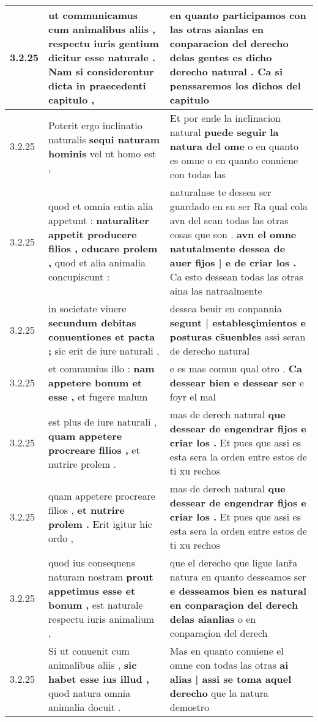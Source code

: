 \begin{tabular}{|p{1cm}|p{6.5cm}|p{6.5cm}|}
3.2.25 & ut communicamus cum animalibus aliis , \textbf{ respectu iuris gentium dicitur esse naturale . } Nam si considerentur dicta in praecedenti capitulo , & en quanto participamos con las otras aianlas \textbf{ en conparacion del derecho delas gentes es dicho derecho natural . } Ca si penssaremos los dichos del capitulo \\\hline
3.2.25 & Poterit ergo inclinatio naturalis \textbf{ sequi naturam hominis } vel ut homo est , & Et por ende la inclinacion natural \textbf{ puede seguir la natura del ome } o en quanto es omne o en quanto conuiene con todas las \\\hline
3.2.25 & quod et omnia entia alia appetunt : \textbf{ naturaliter appetit producere filios , educare prolem , } quod et alia animalia concupiscunt : & naturalnse te dessea ser guardado en su ser Ra qual cola avn del sean todas las otras cosas que son . \textbf{ avn el omne natutalmente dessea de auer fijos | e de criar los . } Ca esto dessean todas las otras aina las natraalmente \\\hline
3.2.25 & in societate viuere \textbf{ secundum debitas conuentiones et pacta ; } sic erit de iure naturali , & dessea beuir en conpannia \textbf{ segunt | establesçimientos e posturas cs̃uenbles } assi seran de derecho natural \\\hline
3.2.25 & et communius illo : \textbf{ nam appetere bonum et esse , } et fugere malum & e es mas comun qual otro . \textbf{ Ca dessear bien e dessear ser } e foyr el mal \\\hline
3.2.25 & est plus de iure naturali , \textbf{ quam appetere procreare filios , } et nutrire prolem . & mas de derech natural \textbf{ que dessear de engendrar fijos e criar los . } Et pues que assi es esta sera la orden entre estos de ti xu rechos \\\hline
3.2.25 & quam appetere procreare filios , \textbf{ et nutrire prolem . } Erit igitur hic ordo , & mas de derech natural \textbf{ que dessear de engendrar fijos e criar los . } Et pues que assi es esta sera la orden entre estos de ti xu rechos \\\hline
3.2.25 & quod ius consequens naturam nostram \textbf{ prout appetimus esse et bonum , } est naturale respectu iuris animalium , & que el derecho que ligue lanr̃a natura en quanto desseamos ser \textbf{ e desseamos bien es natural en conparaçion del derech delas aianlias } o en conparaçion del derech \\\hline
3.2.25 & Si ut conuenit cum animalibus aliis , \textbf{ sic habet esse ius illud , } quod natura omnia animalia docuit . & Mas en quanto conuiene el omne con todas las otras \textbf{ ai alias | assi se toma aquel derecho } que la natura demostro \\\hline

\end{tabular}
